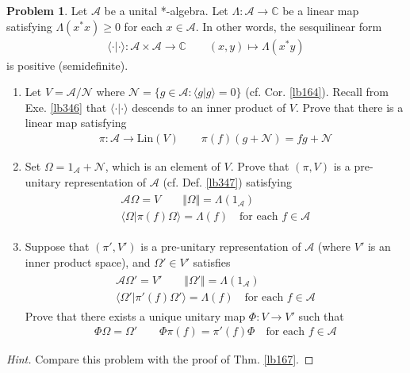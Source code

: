 \documentclass[12pt,b5paper,notitlepage]{article}
\theoremstyle{definition}
\newtheorem{prob}{\color{red}Problem}[section]
\theoremstyle{plain}
\newcommand{\bk}[1]{\langle {#1}\rangle}
\newcommand{\scr}{\mathscr}
\newcommand{\Cbb}{\mathbb C}
\newcommand{\Lin}{\mathrm{Lin}}
\newcommand{\SA}{\mathscr A}
\numberwithin{equation}{section}
\begin{document}
\begin{prob}\label{lb348}
Let $\SA$ be a unital *-algebra. Let $\Lambda:\SA\rightarrow\Cbb$ be a linear map satisfying $\Lambda(x^*x)\geq0$ for each $x\in\SA$. In other words, the sesquilinear form
\begin{gather}\label{eq182}
\bk{\cdot|\cdot}:\SA\times\SA\rightarrow\Cbb\qquad (x,y)\mapsto \Lambda(x^*y)
\end{gather}
is positive (semidefinite).
\begin{enumerate}
\item Let $V=\SA/\scr N$ where $\scr N=\{g\in\SA:\bk{g|g}=0\}$ (cf. Cor. \ref{lb164}). Recall from Exe. \ref{lb346} that $\bk{\cdot|\cdot}$ descends to an inner product of $V$. Prove that there is a linear map satisfying
\begin{align*}
\pi:\SA\rightarrow\Lin(V)\qquad \pi(f)(g+\scr N)=fg+\scr N
\end{align*}
\item Set $\Omega=1_{\scr A}+\scr N$, which is an element of $V$. Prove that $(\pi,V)$ is a pre-unitary representation of $\SA$ (cf. Def. \ref{lb347}) satisfying 
\begin{gather}
\begin{gathered}
\SA\Omega=V\qquad \Vert\Omega\Vert=\Lambda(1_\SA)\\
\bk{\Omega|\pi(f)\Omega}=\Lambda(f)\quad\text{for each }f\in\SA
\end{gathered}
\end{gather}
\item Suppose that $(\pi',V')$ is a pre-unitary representation of $\SA$ (where $V'$ is an inner product space), and $\Omega'\in V'$ satisfies
\begin{gather}
\begin{gathered}
\SA\Omega'=V'\qquad \Vert\Omega'\Vert=\Lambda(1_\SA)\\
\bk{\Omega'|\pi'(f)\Omega'}=\Lambda(f)\quad\text{for each }f\in\SA
\end{gathered}
\end{gather}
Prove that there exists a unique unitary map $\Phi:V\rightarrow V'$ such that
\begin{gather*}
\Phi\Omega=\Omega'\qquad \Phi\pi(f)=\pi'(f)\Phi\quad\text{for each }f\in\SA
\end{gather*}
\end{enumerate}
\end{prob}

\begin{proof}[Hint]
Compare this problem with the proof of Thm. \ref{lb167}.
\end{proof}
\end{document}
